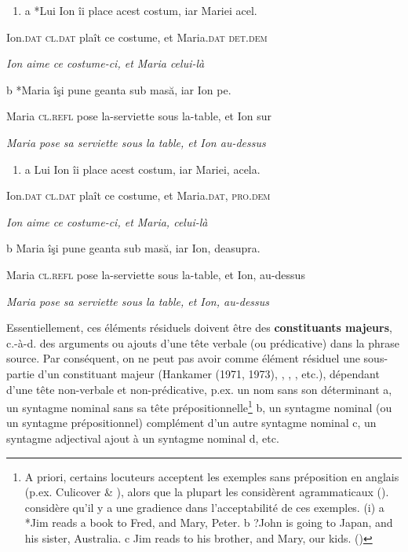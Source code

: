 \begin{enumerate}
\item \label{bkm:Ref298091401}a  *Lui Ion îi place acest costum, iar Mariei acel.


\end{enumerate}
Ion.\textsc{dat cl.dat} plaît ce costume, et Maria.\textsc{dat det.dem}

{\itshape
Ion aime ce costume-ci, et Maria celui-là      } 

  b  *Maria îşi pune geanta sub masă, iar Ion pe.

    Maria \textsc{cl.refl} pose la-serviette sous la-table, et Ion sur

{\itshape
Maria pose sa serviette sous la table, et Ion au-dessus}


\begin{enumerate}
\item \label{bkm:Ref298091439}a  Lui Ion îi place acest costum, iar Mariei, acela.


\end{enumerate}
Ion.\textsc{dat cl.dat} plaît ce costume, et Maria.\textsc{dat, pro.dem}

{\itshape
Ion aime ce costume-ci, et Maria, celui-là      } 

  b  Maria îşi pune geanta sub masă, iar Ion, deasupra.

    Maria \textsc{cl.refl} pose la-serviette sous la-table, et Ion, au-dessus

{\itshape
Maria pose sa serviette sous la table, et Ion, au-dessus}

Essentiellement, ces éléments résiduels doivent être des \textbf{constituants majeurs}, c.-à-d. des arguments ou ajouts d'une tête verbale (ou prédicative) dans la phrase source. Par conséquent, on ne peut pas avoir comme élément résiduel une sous-partie d'un constituant majeur (Hankamer (1971, 1973), \citet{Neijt1979}, \citet{Gardent1991}, \citet{Hartmann2000}, etc.), dépendant d'une tête non-verbale et non-prédicative, p.ex. un nom sans son déterminant a, un syntagme nominal sans sa tête prépositionnelle\footnote{A priori, certains locuteurs acceptent les exemples sans préposition en anglais (p.ex. Culicover \& \citet{Jackendoff2005}), alors que la plupart les considèrent agrammaticaux (\citet{Gardent1991}). \citet{Chaves2005} considère qu'il y a une gradience dans l'acceptabilité de ces exemples. 
(i)  a  *Jim reads a book to Fred, and Mary, Peter. 
  b  ?John is going to Japan, and his sister, Australia.
  c  Jim reads to his brother, and Mary, our kids.        (\citet[11]{Chaves2005}) }  b, un syntagme nominal (ou un syntagme prépositionnel) complément d'un autre syntagme nominal c, un syntagme adjectival ajout à un syntagme nominal d, etc. 


